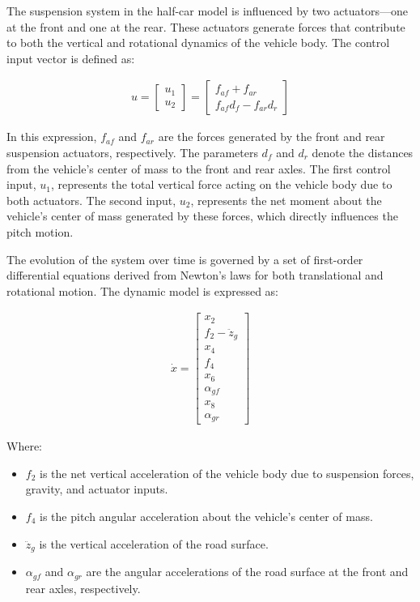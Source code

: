 \documentclass[]{report}
\begin{document}
	The suspension system in the half-car model is influenced by two actuators—one at the front and one at the rear. These actuators generate forces that contribute to both the vertical and rotational dynamics of the vehicle body. The control input vector is defined as:
	
	
	\begin{align}
		u = \begin{bmatrix}
			u_1 \\
			u_2
		\end{bmatrix} =
		\begin{bmatrix}
			f_{af} + f_{ar} \\
			f_{af} d_f - f_{ar} d_r
		\end{bmatrix}
	\end{align}
	
	In this expression, $f_{af}$ and $f_{ar}$ are the forces generated by the front and rear suspension actuators, respectively. The parameters $d_f$ and $d_r$ denote the distances from the vehicle's center of mass to the front and rear axles. The first control input, $u_1$, represents the total vertical force acting on the vehicle body due to both actuators. The second input, $u_2$, represents the net moment about the vehicle’s center of mass generated by these forces, which directly influences the pitch motion.
	
	
	The evolution of the system over time is governed by a set of first-order differential equations derived from Newton’s laws for both translational and rotational motion. The dynamic model is expressed as:
	
	\begin{align}
		\dot{x} = \begin{bmatrix}
			x_2 \\
			f_2 - \ddot{z}_g \\
			x_4 \\
			f_4 \\
			x_6 \\
			\alpha_{gf} \\
			x_8 \\
			\alpha_{gr}
		\end{bmatrix}
	\end{align}
	
	Where:
	\begin{itemize}
		\item $f_2$ is the net vertical acceleration of the vehicle body due to suspension forces, gravity, and actuator inputs.
		\item $f_4$ is the pitch angular acceleration about the vehicle’s center of mass.
		\item $\ddot{z}_g$ is the vertical acceleration of the road surface.
		\item $\alpha_{gf}$ and $\alpha_{gr}$ are the angular accelerations of the road surface at the front and rear axles, respectively.
	\end{itemize}
	
\end{document}
